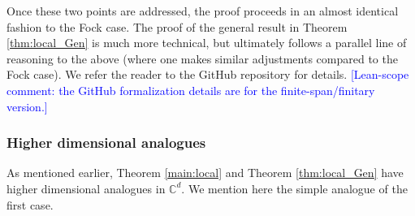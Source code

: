 \documentclass[11pt]{amsart}
\theoremstyle{remark}
\begin{document}
Once these two points are addressed, the proof proceeds in an almost identical fashion to the Fock case. The proof of the general result in Theorem \ref{thm:local_Gen} is much more technical, but ultimately follows a parallel line of reasoning to the above (where one makes similar adjustments compared to the Fock case). We refer the reader to the GitHub repository for details. \textcolor{blue}{[Lean-scope comment: the GitHub formalization details are for the finite-span/finitary version.] }

\subsubsection{Higher dimensional analogues} As mentioned earlier, Theorem \ref{main:local} and Theorem \ref{thm:local_Gen} have higher dimensional analogues in $\mathbb{C}^d$. We mention here the simple analogue of the first case. 
\medskip
\end{document}
